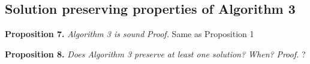 \subsection{Solution preserving properties of Algorithm 3}
\textbf{Proposition 7.} \textit {Algorithm 3 is sound} \newline
\textit{Proof.} Same as Proposition 1


\textbf{Proposition 8.} \textit {Does Algorithm 3 preserve at least one solution? When?} \newline
\textit{Proof.} ?

